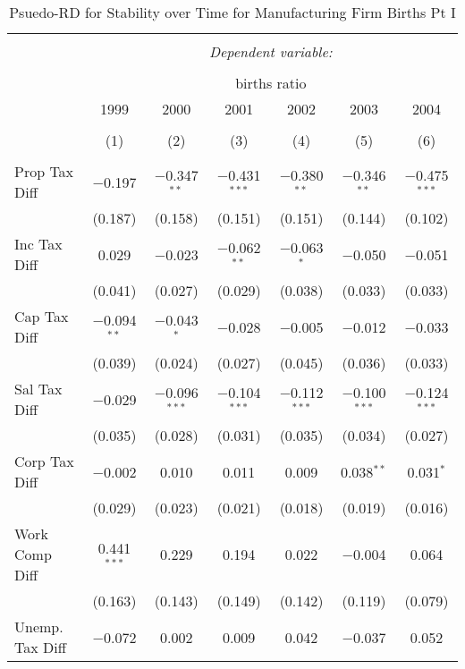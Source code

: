 
\begin{table}[!htbp] \centering 
  \caption{Psuedo-RD for Stability over Time for  Manufacturing Firm Births Pt I} 
  \label{31-33year} 
\small 
\begin{tabular}{@{\extracolsep{5pt}}lcccccc} 
\\[-1.8ex]\hline 
\hline \\[-1.8ex] 
 & \multicolumn{6}{c}{\textit{Dependent variable:}} \\ 
\cline{2-7} 
\\[-1.8ex] & \multicolumn{6}{c}{births ratio} \\ 
 & 1999 & 2000 & 2001 & 2002 & 2003 & 2004 \\ 
\\[-1.8ex] & (1) & (2) & (3) & (4) & (5) & (6)\\ 
\hline \\[-1.8ex] 
 Prop Tax Diff & $-$0.197 & $-$0.347$^{**}$ & $-$0.431$^{***}$ & $-$0.380$^{**}$ & $-$0.346$^{**}$ & $-$0.475$^{***}$ \\ 
  & (0.187) & (0.158) & (0.151) & (0.151) & (0.144) & (0.102) \\ 
  Inc Tax Diff & 0.029 & $-$0.023 & $-$0.062$^{**}$ & $-$0.063$^{*}$ & $-$0.050 & $-$0.051 \\ 
  & (0.041) & (0.027) & (0.029) & (0.038) & (0.033) & (0.033) \\ 
  Cap Tax Diff & $-$0.094$^{**}$ & $-$0.043$^{*}$ & $-$0.028 & $-$0.005 & $-$0.012 & $-$0.033 \\ 
  & (0.039) & (0.024) & (0.027) & (0.045) & (0.036) & (0.033) \\ 
  Sal Tax Diff & $-$0.029 & $-$0.096$^{***}$ & $-$0.104$^{***}$ & $-$0.112$^{***}$ & $-$0.100$^{***}$ & $-$0.124$^{***}$ \\ 
  & (0.035) & (0.028) & (0.031) & (0.035) & (0.034) & (0.027) \\ 
  Corp Tax Diff & $-$0.002 & 0.010 & 0.011 & 0.009 & 0.038$^{**}$ & 0.031$^{*}$ \\ 
  & (0.029) & (0.023) & (0.021) & (0.018) & (0.019) & (0.016) \\ 
  Work Comp Diff & 0.441$^{***}$ & 0.229 & 0.194 & 0.022 & $-$0.004 & 0.064 \\ 
  & (0.163) & (0.143) & (0.149) & (0.142) & (0.119) & (0.079) \\ 
  Unemp. Tax Diff & $-$0.072 & 0.002 & 0.009 & 0.042 & $-$0.037 & 0.052 \\ 

\end{tabular}
\end{table}
